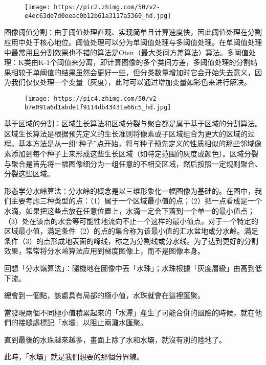 \documentclass[
]{article}
\begin{document}
\begin{figure}
\centering
\texttt{[image: https://pic2.zhimg.com/50/v2-e4ec63de7d0eeac0b12b61a3117a5369\_hd.jpg]}
\caption{}
\end{figure}

图像阈值分割：由于阈值处理直观、实现简单且计算速度快，因此阈值处理在分割应用中处于核心地位。阈值处理可以分为单阈值处理与多阈值处理。在单阈值处理中最常用且分割效果也不错的算法是Otsu（最大类间方差算法）算法。多阈值处理：K类由K-1个阈值来分离，即计算图像的多个类间方差，多阈值处理的分割结果相较于单阈值的结果虽然会更好一些，但分类数量增加时它会开始失去意义，因为我们仅仅处理一个变量（灰度），此时可以通过增加变量如彩色来进行解决。

\begin{figure}
\centering
\texttt{[image: https://pic4.zhimg.com/50/v2-b7e091a6d1abde1f9114db43431a66c5\_hd.jpg]}
\caption{}
\end{figure}

基于区域的分割：区域生长算法和区域分裂与聚合都是属于基于区域的分割算法。区域生长算法是根据预先定义的生长准则将像素或子区域组合为更大的区域的过程。基本方法是从一组``种子''点开始，将与种子预先定义的性质相似的那些邻域像素添加到每个种子上来形成这些生长区域（如特定范围的灰度或颜色）。区域分裂与聚合是首先将一幅图像细分为一组任意的不相交区域，然后按照一定规则聚合、分裂这些区域。

形态学分水岭算法：分水岭的概念是以三维形象化一幅图像为基础的。在图中，我们主要考虑三种类型的点：（1）属于一个区域最小值的点；（2）把一点看成是一个水滴，如果把这些点放在任意位置上，水滴一定会下落到一个单一的最小值点；（3）处在该点的水会等可能性地流向不止一个这样的最小值点。对于一个特定的区域最小值，满足条件（2）的点的集合称为该最小值的汇水盆地或分水岭。满足条件（3）的点形成地表面的峰线，称之为分割线或分水线。为了达到更好的分割效果，常常将分水岭算法应用到梯度图像上，而不是图像本身。

回想「分水嶺算法」：隨機地在圖像中丟「水珠」；水珠根據「灰度層級」由高到低下流。

總會到一個點，該處具有局部的極小值，水珠就會在這裡匯聚。

當發現兩個不同極小值積累起來的「水潭」產生了可能合併的風險的時候，就在他們的接縫處標記「水壩」以阻止兩灘水匯聚。

直到最後的水珠越來越多，畫面上除了水和水壩，就沒有別的陸地了。

此時，「水壩」就是我們想要的那個分界線。
\end{document}
